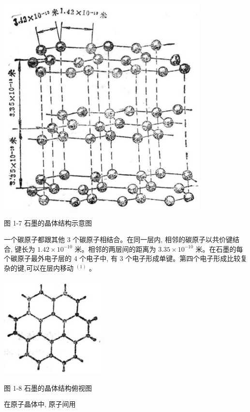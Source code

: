 \documentclass[10pt]{article}
\begin{document}
\begin{center}
\includegraphics[max width=0.8\textwidth]{images/01912d13-9986-7822-a012-3f3f7be99dcb_19_268531.jpg}
\end{center}

图 1-7 石墨的晶体结构示意图

一个碳原子都跟其他 3 个碳原子相结合。在同一层内, 相邻的碳原子以共价键结合, 键长为 \({1.42} \times {10}^{-{10}}\) 米。相邻的两层间的距离为 \({3.35} \times {10}^{-{10}}\) 米。在石墨的每个碳原子最外电子层的 4 个电子中, 有 3 个电子形成单键。第四个电子形成比较复杂的键,可以在层内移动 \({}^{\left( 1\right) }\) 。

\begin{center}
\includegraphics[max width=0.4\textwidth]{images/01912d13-9986-7822-a012-3f3f7be99dcb_19_995840.jpg}
\end{center}

图 1-8 石墨的晶体结构俯视图

在原子晶体中, 原子间用
\end{document}

